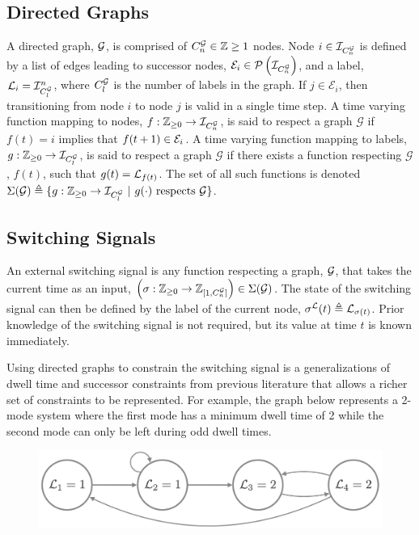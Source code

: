 \subsection{Directed Graphs}
A directed graph, $\mathcal{G}$, is comprised of $\gnumnodes\in\int\geq{1}$ nodes. Node $i\in\idxset{\gnumnodes}$ is defined by a list of edges leading to successor nodes, $\gnodeedges{i}\in\PowerSet{\idxset{\gnumnodes}}$, and a label, $\mathcal{L}_{i}=\mathcal{I}_{C_l^{\mathcal{G}}}^n$, where $C_l^{\mathcal{G}}$ is the number of labels in the graph. If $j\in\mathcal{E}_i$, then transitioning from node $i$ to node $j$ is valid in a single time step. A time varying function mapping to nodes, $f:\int\rgeq{0}\rightarrow\idxset{\gnumnodes}$, is said to respect a graph $\mathcal{G}$ if $f(t)=i$ implies that $f(t+1)\in\gnodeedges{i}$. A time varying function mapping to labels, $g:\mathbb{Z}_{\geq 0}\rightarrow\mathcal{I}_{C_l^{\mathcal{G}}}$, is said to respect a graph $\mathcal{G}$ if  there exists a function respecting $\mathcal{G}$, $f(t)$, such that $g(t)=\mathcal{L}_{f(t)}$. The set of all such functions is denoted $\Sigma(\mathcal{G})\triangleq\{g:\int\rgeq{0}\rightarrow\idxset{\gnumlabels}\ |\ g(\cdot)\text{ respects }\graph\}$. 

\subsection{Switching Signals}
An external switching signal is any function respecting a graph, $\mathcal{G}$, that takes the current time as an input, $\left(\ss:\int\rgeq{0}\rightarrow\int\rii{1}{\gnumnodes}\right)\in\Sigma(\graph)$. The state of the switching signal can then be defined by the label of the current node, $\ssl(t)\triangleq \gnodelabel{\ss(t)}$. Prior knowledge of the switching signal is not required, but its value at time $t$ is known immediately.
\begin{remark}
Using directed graphs to constrain the switching signal is a generalizations of dwell time and successor constraints from previous literature that allows a richer set of constraints to be represented. For example, the graph below represents a 2-mode system where the first mode has a minimum dwell time of 2 while the second mode can only be left during odd dwell times.
\begin{figure}[h!]
\centering
\includegraphics[scale=0.15]{./figures/graph_remark}
\end{figure}
\end{remark}

